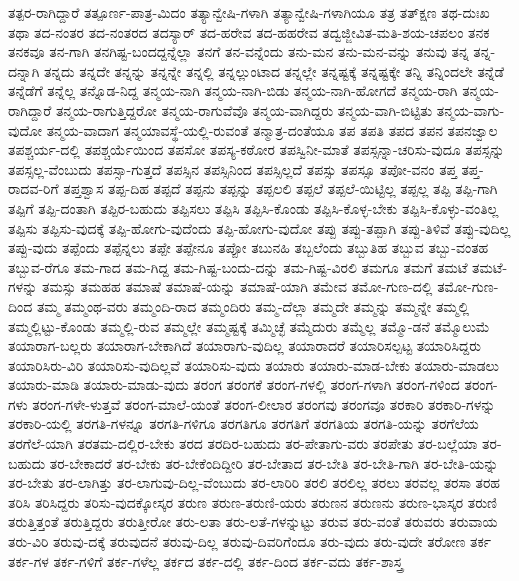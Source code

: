 {ತತ್ಪರ-ರಾಗಿದ್ದಾರೆ
ತತ್ಪೂರ್ಣ-ಪಾತ್ರ-ಮಿದಂ
ತತ್ಯಾನ್ವೇಷಿ-ಗಳಾಗಿ
ತತ್ಯಾನ್ವೇಷಿ-ಗಳಾಗಿಯೂ
ತತ್ರ
ತತ್ಕ್ಷಣ
ತಥ-ದುಃಖ
ತಥಾ
ತದ-ನಂತರ
ತದ-ನಂತರದ
ತದಸ್ಯಾರ್
ತದ-ಹರೇವ
ತದ-ಹಹರೇವ
ತದ್ವಜ್ಜೀವಿತ-ಮತಿ-ಶಯ-ಚಪಲಂ
ತನಕ
ತನಕವೂ
ತನ-ಗಾಗಿ
ತನಗಿಷ್ಟ-ಬಂದದ್ದನ್ನೆಲ್ಲಾ
ತನಗೆ
ತನ-ವನ್ನೆಂದು
ತನು-ಮನ
ತನು-ಮನ-ವನ್ನು
ತನುವು
ತನ್ನ
ತನ್ನ-ದನ್ನಾಗಿ
ತನ್ನದು
ತನ್ನದೇ
ತನ್ನನ್ನು
ತನ್ನನ್ನೇ
ತನ್ನಲ್ಲಿ
ತನ್ನಲ್ಲುಂಟಾದ
ತನ್ನಲ್ಲೇ
ತನ್ನಷ್ಟಕ್ಕೆ
ತನ್ನಷ್ಟಕ್ಕೇ
ತನ್ನಿ
ತನ್ನಿಂದಲೇ
ತನ್ನೆಡೆ
ತನ್ನೆಡೆಗೆ
ತನ್ನೆಲ್ಲ
ತನ್ನೊಡ-ನಿದ್ದ
ತನ್ಮಯ-ನಾಗಿ
ತನ್ಮಯ-ನಾಗಿ-ಬಿಡು
ತನ್ಮಯ-ನಾಗಿ-ಹೋಗದೆ
ತನ್ಮಯ-ರಾಗಿ
ತನ್ಮಯ-ರಾಗಿದ್ದಾರೆ
ತನ್ಮಯ-ರಾಗುತ್ತಿದ್ದರೋ
ತನ್ಮಯ-ರಾಗುವೆವೊ
ತನ್ಮಯ-ವಾಗಿದ್ದರು
ತನ್ಮಯ-ವಾಗಿ-ಬಿಟ್ಟಿತು
ತನ್ಮಯ-ವಾಗು-ವುದೋ
ತನ್ಮಯ-ವಾದಾಗ
ತನ್ಮಯಾವಸ್ಥೆ-ಯಲ್ಲಿ-ರುವಂತೆ
ತನ್ಮಾತ್ರ-ದಂತೆಯೂ
ತಪ
ತಪತಿ
ತಪದ
ತಪನ
ತಪನಜ್ವಾಲ
ತಪಶ್ಚರ್ಯ-ದಲ್ಲಿ
ತಪಶ್ಚರ್ಯೆಯಿಂದ
ತಪಸೋ
ತಪಸ್ಯ-ಕಠೋರ
ತಪಸ್ವಿನೀ-ಮಾತೆ
ತಪಸ್ಸನ್ನಾ-ಚರಿಸು-ವುದೂ
ತಪಸ್ಸನ್ನು
ತಪಸ್ಸಲ್ಲ-ವೆಂಬುದು
ತಪಸ್ಸಾ-ಗುತ್ತದೆ
ತಪಸ್ಸಿನ
ತಪಸ್ಸಿನಿಂದ
ತಪಸ್ಸಿಲ್ಲದೆ
ತಪಸ್ಸು
ತಪಸ್ಸೂ
ತಪೋ-ವನಂ
ತಪ್ತ
ತಪ್ತ-ರಾದವ-ರಿಗೆ
ತಪ್ತಶ್ವಾಸ
ತಪ್ಪ-ದಿಹ
ತಪ್ಪದೆ
ತಪ್ಪನು
ತಪ್ಪನ್ನು
ತಪ್ಪಲಲಿ
ತಪ್ಪಲೆ
ತಪ್ಪಲೆ-ಯಿಟ್ಟಿಲ್ಲ
ತಪ್ಪಲ್ಲ
ತಪ್ಪಿ
ತಪ್ಪಿ-ಗಾಗಿ
ತಪ್ಪಿಗೆ
ತಪ್ಪಿ-ದಂತಾಗಿ
ತಪ್ಪಿರ-ಬಹುದು
ತಪ್ಪಿಸಲು
ತಪ್ಪಿಸಿ
ತಪ್ಪಿಸಿ-ಕೊಂಡು
ತಪ್ಪಿಸಿ-ಕೊಳ್ಳ-ಬೇಕು
ತಪ್ಪಿಸಿ-ಕೊಳ್ಳು-ವಂತಿಲ್ಲ
ತಪ್ಪಿಸು
ತಪ್ಪಿಸು-ವುದಕ್ಕೆ
ತಪ್ಪಿ-ಹೋಗು-ವುದೆಂದು
ತಪ್ಪಿ-ಹೋಗು-ವುದೋ
ತಪ್ಪು
ತಪ್ಪು-ತಪ್ಪಾಗಿ
ತಪ್ಪು-ತಿಳಿವೆ
ತಪ್ಪು-ವುದಿಲ್ಲ
ತಪ್ಪು-ವುದು
ತಪ್ಪೆಂದು
ತಪ್ಪೆನ್ನಲು
ತಪ್ಪೇ
ತಪ್ಪೇನೂ
ತಪ್ಪೋ
ತಬುನಹಿ
ತಬ್ಬಲೆಂದು
ತಬ್ಬುತಿಹ
ತಬ್ಬುವ
ತಬ್ಬು-ವಂತಹ
ತಬ್ಬುವ-ರೆಗೂ
ತಮ-ಗಾದ
ತಮ-ಗಿದ್ದ
ತಮ-ಗಿಷ್ಟ-ಬಂದು-ದನ್ನು
ತಮ-ಗಿಷ್ಟ-ವಿರಲಿ
ತಮಗೂ
ತಮಗೆ
ತಮಟೆ
ತಮಟೆ-ಗಳನ್ನು
ತಮಸ್ಸು
ತಮಹಹ
ತಮಾಷೆ
ತಮಾಷೆ-ಯನ್ನು
ತಮಾಷೆ-ಯಾಗಿ
ತಮೇವ
ತಮೋ-ಗುಣ-ದಲ್ಲಿ
ತಮೋ-ಗುಣ-ದಿಂದ
ತಮ್ಮ
ತಮ್ಮಂಥ-ವರು
ತಮ್ಮಂದಿ-ರಾದ
ತಮ್ಮಂದಿರು
ತಮ್ಮ-ದೆಲ್ಲಾ
ತಮ್ಮದೇ
ತಮ್ಮನ್ನು
ತಮ್ಮನ್ನೇ
ತಮ್ಮಲ್ಲಿ
ತಮ್ಮಲ್ಲಿಟ್ಟು-ಕೊಂಡು
ತಮ್ಮಲ್ಲಿ-ರುವ
ತಮ್ಮಲ್ಲೇ
ತಮ್ಮಷ್ಟಕ್ಕೆ
ತಮ್ಮಿಚ್ಛೆ
ತಮ್ಮೆದುರು
ತಮ್ಮೆಲ್ಲ
ತಮ್ಮೊ-ಡನೆ
ತಮ್ಮೊಲುಮೆ
ತಯಾರಾಗ-ಬಲ್ಲರು
ತಯಾರಾಗ-ಬೇಕಾಗಿದೆ
ತಯಾರಾಗು-ವುದಿಲ್ಲ
ತಯಾರಾದರೆ
ತಯಾರಿಸಲ್ಪಟ್ಟ
ತಯಾರಿಸಿದ್ದರು
ತಯಾರಿಸಿರು-ವಿರಿ
ತಯಾರಿಸು-ವುದಿಲ್ಲವೆ
ತಯಾರಿಸು-ವುದು
ತಯಾರು
ತಯಾರು-ಮಾಡ-ಬೇಕು
ತಯಾರು-ಮಾಡಲು
ತಯಾರು-ಮಾಡಿ
ತಯಾರು-ಮಾಡು-ವುದು
ತರಂಗ
ತರಂಗಕೆ
ತರಂಗ-ಗಳಲ್ಲಿ
ತರಂಗ-ಗಳಾಗಿ
ತರಂಗ-ಗಳಿಂದ
ತರಂಗ-ಗಳು
ತರಂಗ-ಗಳೇ-ಳುತ್ತವೆ
ತರಂಗ-ಮಾಲೆ-ಯಂತೆ
ತರಂಗ-ಲೀಲಾರ
ತರಂಗವು
ತರಂಗವೂ
ತರಕಾರಿ
ತರಕಾರಿ-ಗಳನ್ನು
ತರಕಾರಿ-ಯಲ್ಲಿ
ತರಗತಿ-ಗಳನ್ನೂ
ತರಗತಿ-ಗಳಿಗೂ
ತರಗತಿಗೂ
ತರಗತಿಗೆ
ತರಗತಿಯ
ತರಗತಿ-ಯನ್ನು
ತರಗೆಲೆಯ
ತರಗೆಲೆ-ಯಾಗಿ
ತರತಮ-ದಲ್ಲಿರ-ಬೇಕು
ತರದ
ತರದಿರ-ಬಹುದು
ತರ-ಪೇತಾಗು-ವರು
ತರಪೇತು
ತರ-ಬಲ್ಲೆಯಾ
ತರ-ಬಹುದು
ತರ-ಬೇಕಾದರೆ
ತರ-ಬೇಕು
ತರ-ಬೇಕೆಂದಿದ್ದೀರಿ
ತರ-ಬೇತಾದ
ತರ-ಬೇತಿ
ತರ-ಬೇತಿ-ಗಾಗಿ
ತರ-ಬೇತಿ-ಯನ್ನು
ತರ-ಬೇತು
ತರ-ಲಾಗಿತ್ತು
ತರ-ಲಾಗುವು-ದಿಲ್ಲ-ವೆಂಬುದು
ತರ-ಲಾರಿರಿ
ತರಲಿ
ತರಲಿಲ್ಲ
ತರಲು
ತರವಲ್ಲ
ತರಸಾ
ತರಹ
ತರಿಸಿ
ತರಿಸಿದ್ದರು
ತರಿಸು-ವುದಕ್ಕೋಸ್ಕರ
ತರುಣ
ತರುಣ-ತರುಣಿ-ಯರು
ತರುಣನ
ತರುಣನು
ತರುಣ-ಭಾಸ್ಕರ
ತರುಣಿ
ತರುತ್ತಿತ್ತಂತೆ
ತರುತ್ತಿದ್ದರು
ತರುತ್ತೀರೋ
ತರು-ಲತಾ
ತರು-ಲತೆ-ಗಳನ್ನುಟ್ಟು
ತರುವ
ತರು-ವಂತೆ
ತರುವರು
ತರುವಾಯ
ತರು-ವಿರಿ
ತರುವು-ದಕ್ಕೆ
ತರುವುದನೆ
ತರುವು-ದಿಲ್ಲ
ತರುವು-ದಿವರಿಗೆಂದೂ
ತರು-ವುದು
ತರು-ವುದೇ
ತರೋಣ
ತರ್ಕ
ತರ್ಕ-ಗಳ
ತರ್ಕ-ಗಳಿಗೆ
ತರ್ಕ-ಗಳೆಲ್ಲ
ತರ್ಕದ
ತರ್ಕ-ದಲ್ಲಿ
ತರ್ಕ-ದಿಂದ
ತರ್ಕ-ವದು
ತರ್ಕ-ಶಾಸ್ತ್ರ
}
